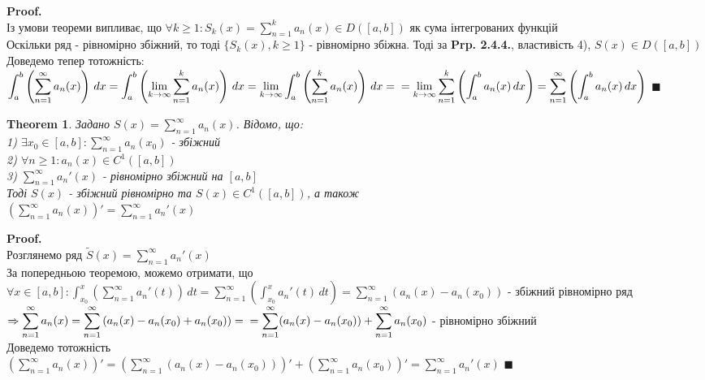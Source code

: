 \documentclass[a4paper, 14pt]{extarticle}
\def\huge{\displaystyle}
\def\bigline{\vspace{5mm}\\}
\theoremstyle{theoremdd}
\newtheorem{theorem}{Theorem}[subsection]
\theoremstyle{theoremdd}
\theoremstyle{theoremdd}
\theoremstyle{theoremdd}
\theoremstyle{theoremdd}
\theoremstyle{theoremdd}
\theoremstyle{theoremdd}
\theoremstyle{theoremdd}
\newenvironment{pf}{\vspace*{-3mm} \textbf{Proof. \\}}{$\blacksquare$}
\begin{document}
\begin{pf}
Із умови теореми випливає, що $\forall k \geq 1: S_k(x) = \huge \sum_{n=1}^k a_n(x) \in D([a,b])$ як сума інтегрованих функцій\\
Оскільки ряд - рівномірно збіжний, то тоді $\{S_k(x), k \geq 1\}$ - рівномірно збіжна. Тоді за \textbf{Prp. 2.4.4.}, властивість 4), $S(x) \in D([a,b])$\\
Доведемо тепер тотожність:\\
$\huge \int_a^b \left( \sum_{n=1}^\infty a_n(x) \right) \,dx = \int_a^b \left( \lim_{k \to \infty} \sum_{n=1}^k a_n(x) \right) \,dx = \lim_{k \to \infty} \int_a^b \left( \sum_{n=1}^k a_n(x) \right) \,dx = \\ = \lim_{k \to \infty} \sum_{n=1}^k \left( \int_a^b a_n(x)\,dx \right) = \sum_{n=1}^\infty \left( \int_a^b a_n(x)\,dx \right)$
\end{pf}

\begin{theorem}
Задано $S(x) = \huge \sum_{n=1}^\infty a_n(x)$. Відомо, що:\\
1) $\exists x_0 \in [a,b]: \huge \sum_{n=1}^\infty a_n(x_0)$ - збіжний\\
2) $\forall n \geq 1: a_n(x) \in C^{1}([a,b])$\\
3) $\huge \sum_{n=1}^\infty a_n'(x)$ - рівномірно збіжний на $[a,b]$\\
Тоді $S(x)$ - збіжний рівномірно та $S(x) \in C^1([a,b])$, а також\\
$\huge \left(  \sum_{n=1}^\infty a_n(x) \right)' = \sum_{n=1}^\infty a_n'(x)$
\end{theorem}

\begin{pf}
Розглянемо ряд $\tilde{S}(x) = \huge \sum_{n=1}^\infty a_n'(x)$\\
За попередньою теоремою, можемо отримати, що\\
$\forall x \in [a,b]: \huge \int_{x_0}^x \left( \sum_{n=1}^\infty a_n'(t) \right) \,dt = \sum_{n=1}^\infty \left( \int_{x_0}^x a_n'(t) \,dt \right) = \sum_{n=1}^\infty \left( a_n(x) - a_n(x_0) \right)$ - збіжний рівномірно ряд\\
$\Rightarrow \huge \sum_{n=1}^\infty a_n(x) = \sum_{n=1}^\infty \left(a_n(x) - a_n(x_0) + a_n(x_0) \right) = \\ = \sum_{n=1}^\infty (a_n(x) - a_n(x_0)) + \sum_{n=1}^\infty a_n(x_0)$ - рівномірно збіжний\\
Доведемо тотожність\\
$ \huge \left( \sum_{n=1}^\infty a_n(x) \right)' = \left( \sum_{n=1}^\infty (a_n(x) - a_n(x_0)) \right)' + \left( \sum_{n=1}^\infty a_n(x_0) \right)' = \sum_{n=1}^\infty a_n'(x)$
\end{pf}
\bigline
\end{document}
